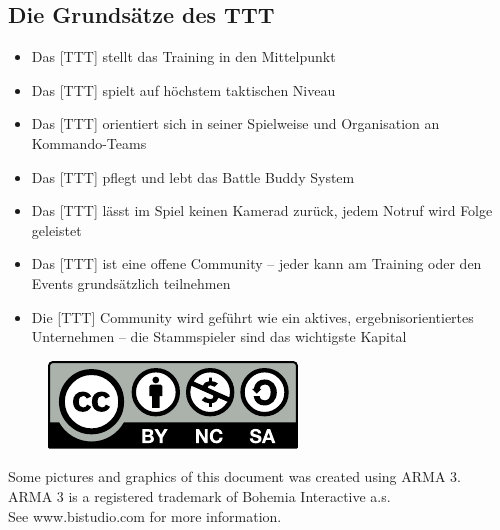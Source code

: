 \subsection*{Die Grundsätze des TTT}
\label{sec:Grundsaetze}
	\begin{itemize}
		\item Das [TTT] stellt das Training in den Mittelpunkt
		\item Das [TTT] spielt auf höchstem taktischen Niveau
		\item Das [TTT] orientiert sich in seiner Spielweise und Organisation an Kommando-Teams
		\item Das [TTT] pflegt und lebt das Battle Buddy System
		\item Das [TTT] lässt im Spiel keinen Kamerad zurück, jedem Notruf wird Folge geleistet
		\item Das [TTT] ist eine offene Community -- jeder kann am Training oder den Events grundsätzlich teilnehmen
		\item Die [TTT] Community wird geführt wie ein aktives, ergebnisorientiertes Unternehmen -- die Stammspieler sind das wichtigste Kapital	
	\end{itemize}

\vspace*{\fill}
	\begin{figure}[htbp]
		\includegraphics{./img/by-nc-sa}
	\end{figure}

Some pictures and graphics of this document was created using ARMA 3.\\
ARMA 3 is a registered trademark of Bohemia Interactive a.s.\\
See www.bistudio.com for more information.